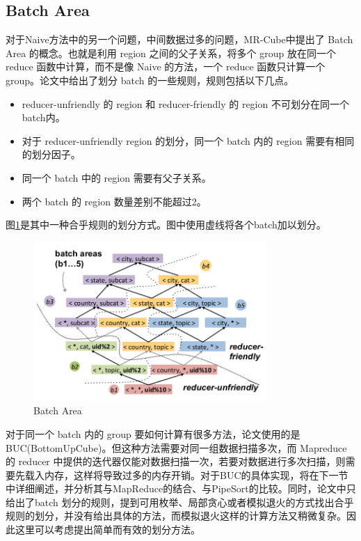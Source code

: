 \subsection{Batch Area}

对于Naive方法中的另一个问题，中间数据过多的问题，MR-Cube中提出了 Batch Area 的概念。也就是利用 region 之间的父子关系，将多个 group 放在同一个 reduce 函数中计算，而不是像 Naive 的方法，一个 reduce 函数只计算一个 group。论文中给出了划分 batch 的一些规则，规则包括以下几点。
\begin{itemize}
\item reducer-unfriendly 的 region 和 reducer-friendly 的 region 不可划分在同一个batch内。
\item 对于 reducer-unfriendly region 的划分，同一个 batch 内的 region 需要有相同的划分因子。
\item 同一个 batch 中的 region 需要有父子关系。
\item 两个 batch 的 region 数量差别不能超过2。
\end{itemize}

图\ref{batch_area}是其中一种合乎规则的划分方式。图中使用虚线将各个batch加以划分。

\begin{figure}[!ht] 
\centering\includegraphics[width=3.5in]{picture/ch_datacube_mr/batch_area} 
\caption{Batch Area}\label{batch_area} 
\end{figure}

对于同一个 batch 内的 group 要如何计算有很多方法，论文使用的是BUC(BottomUpCube)。但这种方法需要对同一组数据扫描多次，而 Mapreduce 的 reducer 中提供的迭代器仅能对数据扫描一次，若要对数据进行多次扫描，则需要先载入内存，这样将导致过多的内存开销。对于BUC的具体实现，将在下一节中详细阐述，并分析其与MapReduce的结合、与PipeSort的比较。同时，论文中只给出了batch 划分的规则，提到可用枚举、局部贪心或者模拟退火的方式找出合乎规则的划分，并没有给出具体的方法，而模拟退火这样的计算方法又稍微复杂。因此这里可以考虑提出简单而有效的划分方法。


